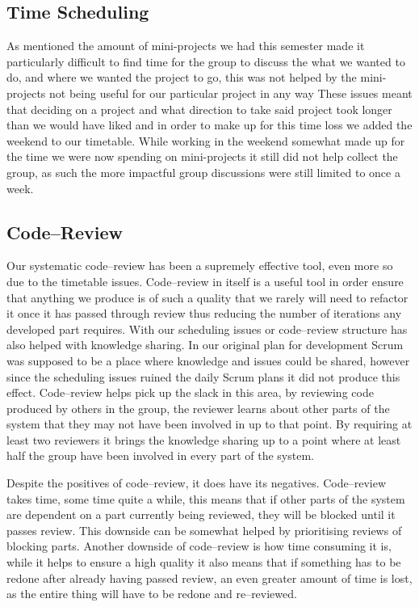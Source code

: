 \subsection{Time Scheduling}\label{sub:time_scheduling}
As mentioned the amount of mini-projects we had this semester made it particularly difficult to find time for the group to discuss the what we wanted to do, and where we wanted the project to go, this was not helped by the mini-projects not being useful for our particular project in any way
These issues meant that deciding on a project and what direction to take said project took longer than we would have liked and in order to make up for this time loss we added the weekend to our timetable.
While working in the weekend somewhat made up for the time we were now spending on mini-projects it still did not help collect the group, as such the more impactful group discussions were still limited to once a week.

\subsection{Code--Review}
Our systematic code--review has been a supremely effective tool, even more so due to the timetable issues.
Code--review in itself is a useful tool in order ensure that anything we produce is of such a quality that we rarely will need to refactor it once it has passed through review thus reducing the number of iterations any developed part requires.
With our scheduling issues or code--review structure has also helped with knowledge sharing.
In our original plan for development Scrum was supposed to be a place where knowledge and issues could be shared, however since the scheduling issues ruined the daily Scrum plans it did not produce this effect.
Code--review helps pick up the slack in this area, by reviewing code produced by others in the group, the reviewer learns about other parts of the system that they may not have been involved in up to that point.
By requiring at least two reviewers it brings the knowledge sharing up to a point where at least half the group have been involved in every part of the system.

Despite the positives of code--review, it does have its negatives.
Code--review takes time, some time quite a while, this means that if other parts of the system are dependent on a part currently being reviewed, they will be blocked until it passes review.
This downside can be somewhat helped by prioritising reviews of blocking parts.
Another downside of code--review is how time consuming it is, while it helps to ensure a high quality it also means that if something has to be redone after already having passed review, an even greater amount of time is lost, as the entire thing will have to be redone and re--reviewed.

